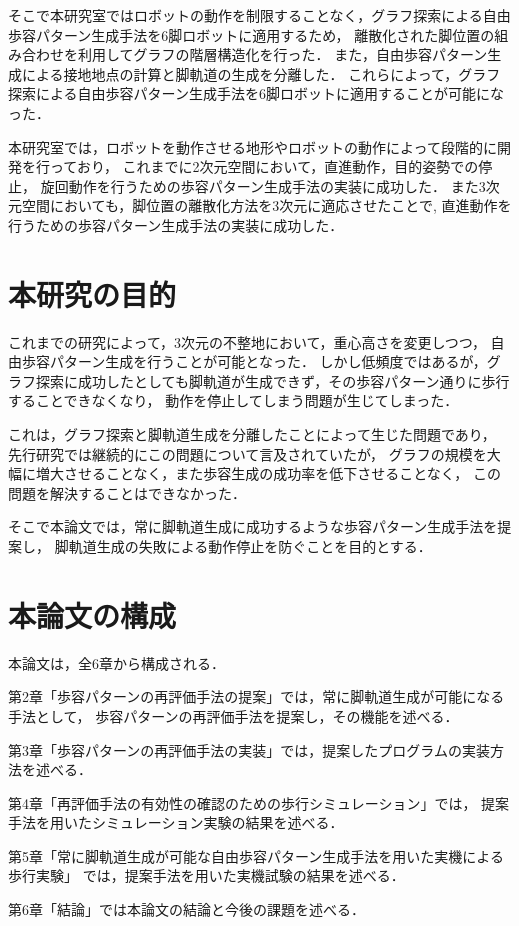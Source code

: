 そこで本研究室ではロボットの動作を制限することなく，グラフ探索による自由歩容パターン生成手法を6脚ロボットに適用するため，
離散化された脚位置の組み合わせを利用してグラフの階層構造化を行った．
また，自由歩容パターン生成による接地地点の計算と脚軌道の生成を分離した．
これらによって，グラフ探索による自由歩容パターン生成手法を6脚ロボットに適用することが可能になった．

本研究室では，ロボットを動作させる地形やロボットの動作によって段階的に開発を行っており，
これまでに2次元空間において，直進動作\cite{Oki_Graph_search}，目的姿勢での停止\cite{Nakaoka_Graph_search}，
旋回動作\cite{Shina_Graph_search}を行うための歩容パターン生成手法の実装に成功した．
また3次元空間においても，脚位置の離散化方法を3次元に適応させたことで\cite{Miura_Graph_search},
直進動作\cite{Hato_Graph_search}を行うための歩容パターン生成手法の実装に成功した．

\section{本研究の目的}
これまでの研究によって，3次元の不整地において，重心高さを変更しつつ，
自由歩容パターン生成を行うことが可能となった．
しかし低頻度ではあるが，グラフ探索に成功したとしても脚軌道が生成できず，その歩容パターン通りに歩行することできなくなり，
動作を停止してしまう問題が生じてしまった．

これは，グラフ探索と脚軌道生成を分離したことによって生じた問題であり，
先行研究では継続的にこの問題について言及されていたが，
グラフの規模を大幅に増大させることなく，また歩容生成の成功率を低下させることなく，
この問題を解決することはできなかった．

そこで本論文では，常に脚軌道生成に成功するような歩容パターン生成手法を提案し，
脚軌道生成の失敗による動作停止を防ぐことを目的とする．

\section{本論文の構成}
本論文は，全6章から構成される．

第2章「歩容パターンの再評価手法の提案」では，常に脚軌道生成が可能になる手法として，
歩容パターンの再評価手法を提案し，その機能を述べる．

第3章「歩容パターンの再評価手法の実装」では，提案したプログラムの実装方法を述べる．

第4章「再評価手法の有効性の確認のための歩行シミュレーション」では，
提案手法を用いたシミュレーション実験の結果を述べる．

第5章「常に脚軌道生成が可能な自由歩容パターン生成手法を用いた実機による歩行実験」
では，提案手法を用いた実機試験の結果を述べる．

第6章「結論」では本論文の結論と今後の課題を述べる．
